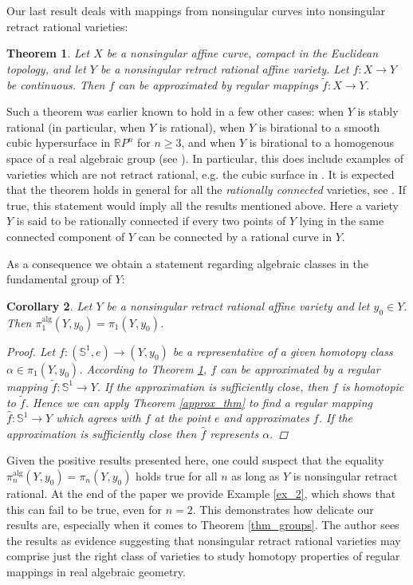 \documentclass{article}
\theoremstyle{plain}
\newtheorem{thm}{Theorem}[section]
\newtheorem{cor}[thm]{Corollary}
\theoremstyle{definition}
\theoremstyle{remark}
\newcommand{\R}{\mathbb{R}}
\newcommand{\s}{\mathbb{S}}
\newcommand{\alg}{\mathrm{alg}}
\begin{document}
Our last result deals with mappings from nonsingular curves into nonsingular retract rational varieties:
\begin{thm}\label{thm_curves}
Let $X$ be a nonsingular affine curve, compact in the Euclidean topology, and let $Y$ be a nonsingular retract rational affine variety. Let $f:X\rightarrow Y$ be continuous. Then $f$ can be approximated by regular mappings $\tilde{f}:X\rightarrow Y$.
\end{thm}


Such a theorem was earlier known to hold in a few other cases: when $Y$ is stably rational (in particular, when $Y$ is rational), when $Y$ is birational to a smooth cubic hypersurface in $\R P^n$ for $n\geq 3$, and when $Y$ is birational to a homogenous space of a real algebraic group (see \cite[Theorem A and Corollary 4.4]{benoistTightApproximationProperty2021}). In particular, this does include examples of varieties which are not retract rational, e.g. the cubic surface in \cite[Example 6.3]{baneckiRelativeStoneWeierstrassTheorem2024}. It is expected that the theorem holds in general for all the \emph{rationally connected} varieties, 
see \cite[Question 4]{kucharzOpenQuestionsReal2022}. If true, this statement would imply all the results mentioned above. Here a variety $Y$ is said to be rationally connected if every two points of $Y$ lying in the same connected component of $Y$ can be connected by a rational curve in $Y$.

As a consequence we obtain a statement regarding algebraic classes in the fundamental group of $Y$:
\begin{cor}\label{cor:first_group}
Let $Y$ be a nonsingular retract rational affine variety and let $y_0\in Y$. Then $\pi_1^\alg(Y,y_0)=\pi_1(Y,y_0)$.
\begin{proof}
Let $f:(\s^1,e)\rightarrow (Y,y_0)$ be a representative of a given homotopy class $\alpha \in \pi_1(Y,y_0)$. According to Theorem \ref{thm_curves}, $f$ can be approximated by a regular mapping $\tilde{f}:\s^1\rightarrow Y$. If the approximation is sufficiently close, then $f$ is homotopic to $\tilde{f}$. Hence we can apply Theorem \ref{approx_thm} to find a regular mapping $\hat{f}:\s^1\rightarrow Y$ which agrees with $f$ at the point $e$ and approximates $f$. If the approximation is sufficiently close then $\hat{f}$ represents $\alpha$.
\end{proof}
\end{cor}

Given the positive results presented here, one could suspect that the equality $\pi_n^\alg(Y,y_0)=\pi_n(Y,y_0)$ holds true for all $n$ as long as $Y$ is nonsingular retract rational. At the end of the paper we provide Example \ref{ex_2}, which shows that this can fail to be true, even for $n=2$. This demonstrates how delicate our results are, especially when it comes to Theorem \ref{thm_groups}. The author sees the results as evidence suggesting that nonsingular retract rational varieties may comprise just the right class of varieties to study homotopy properties of regular mappings in real algebraic geometry.
\end{document}
